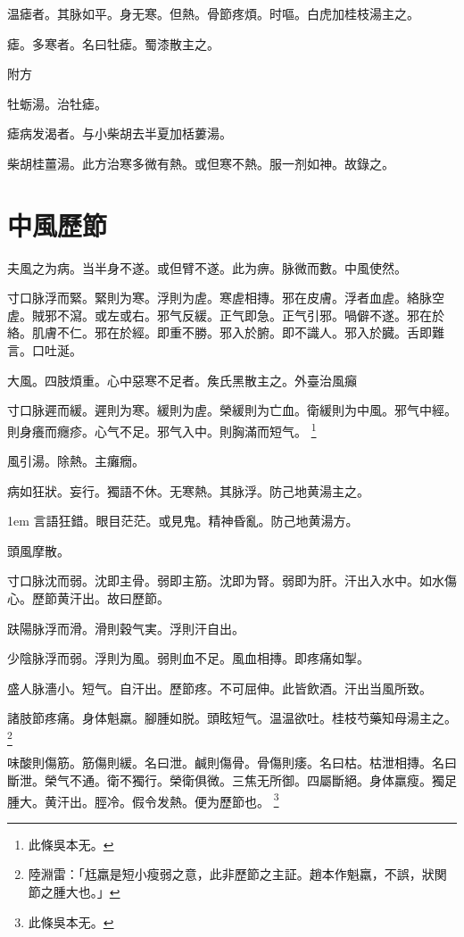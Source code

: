 温瘧者。其脉如平。身无寒。但熱。骨節疼煩。时嘔。白虎加桂枝湯主之。

瘧。多寒者。名曰牡瘧。蜀漆散主之。

附方

牡蛎湯。治牡瘧。

瘧病发渴者。与小柴胡去半夏加栝蔞湯。

柴胡桂薑湯。{\scriptsize 此方治寒多微有熱。或但寒不熱。服一剂如神。故錄之。}

\chapter{中風歷節}

夫風之为病。当半身不遂。或但臂不遂。此为痹。脉微而數。中風使然。

寸口脉浮而緊。緊則为寒。浮則为虗。寒虗相摶。邪在皮膚。浮者血虗。絡脉空虗。賊邪不瀉。或左或右。邪气反緩。正气即急。正气引邪。喎僻不遂。邪在於絡。肌膚不仁。邪在於經。即重不勝。邪入於腑。即不識人。邪入於臓。舌即難言。口吐涎。

大風。四肢煩重。心中惡寒不足者。矦氏黑散主之。{\scriptsize 外臺治風癲}

寸口脉遲而緩。遲則为寒。緩則为虗。榮緩則为亡血。衛緩則为中風。邪气中經。則身癢而癮疹。心气不足。邪气入中。則胸滿而短气。
	\footnote{此條吳本无。}

風引湯。除熱{\khaaitp 。主}癱癇。

病如狂狀。妄行。獨語不休。无寒熱。其脉浮。防己地黄湯主之。

\hangindent 1em
言語狂錯。眼目茫茫。或見鬼。精神昏亂。防己地黄湯方。{\qianjin}

頭風摩散。

寸口脉沈而弱。沈即主骨。弱即主筋。沈即为腎。弱即为肝。汗出入水中。如水傷心。歷節黄汗出。故曰歷節。

趺陽脉浮而滑。滑則穀气実。浮則汗自出。

少陰脉浮而弱。浮則为風。弱則血不足。風血相摶。即疼痛如掣。

盛人脉濇小。短气。自汗出。歷節疼。不可屈伸。此皆飲酒。汗出当風所致。

諸肢節疼痛。身体魁羸。腳腫如脱。頭眩短气。温温欲吐。桂枝芍藥知母湯主之。
	\footnote{
		陸淵雷：「尪羸是短小瘦弱之意，此非歷節之主証。趙本作魁羸，不誤，狀関節之腫大也。」
	}

味酸則傷筋。筋傷則緩。名曰泄。鹹則傷骨。骨傷則痿。名曰枯。枯泄相摶。名曰斷泄。榮气不通。衛不獨行。榮衛俱微。三焦无所御。四屬斷絕。身体羸瘦。獨足腫大。黄汗出。脛冷。假令发熱。便为歷節也。
	\footnote{此條吳本无。}


